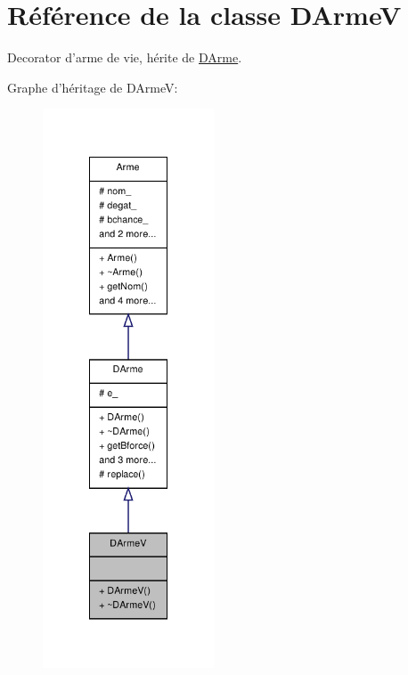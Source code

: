 \hypertarget{class_d_arme_v}{\section{Référence de la classe D\-Arme\-V}
\label{class_d_arme_v}
}


Decorator d'arme de vie, hérite de \hyperlink{class_d_arme}{D\-Arme}.  




Graphe d'héritage de D\-Arme\-V\-:
\nopagebreak
\begin{figure}[H]
\begin{center}
\leavevmode
\includegraphics[width=144pt]{class_d_arme_v__inherit__graph}
\end{center}
\end{figure}


